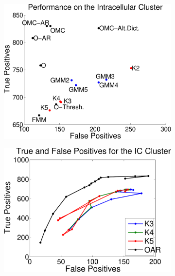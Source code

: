 % 
\begin{center}
\begin{figure}
\begin{subfigure}[b]{.49\textwidth}
\centering
\includegraphics[width=\textwidth]{../figs/truefalsepositive.pdf}
\caption{}
\label{hc1res}
\end{subfigure}
\begin{subfigure}[b]{.49\textwidth}
\includegraphics[width=\textwidth]{../figs/new/icroc.pdf}
\caption{}
\label{overlapping}
\end{subfigure}

\end{figure}
\end{center}
